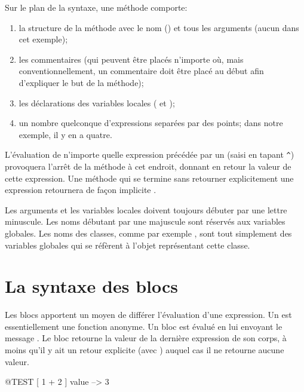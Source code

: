 \documentclass[a4paper,10pt,twoside]{book}
\begin{document}
Sur le plan de la syntaxe, une m\'{e}thode comporte:
\begin{enumerate}
  \item la structure de la m\'{e}thode avec le nom (\ie {}) et tous les arguments (aucun dans cet exemple);
  \item les commentaires (qui peuvent \^{e}tre plac\'{e}s n'importe
    o\`{u}, mais conventionnellement, un commentaire doit \^{e}tre plac\'{e} au d\'{e}but afin d'expliquer le but de la m\'{e}thode);
  \item les d\'{e}clarations des variables locales (\ie {} et
    ); 
  \item un nombre quelconque d'expressions separ\'{e}es par des points; dans notre exemple, il y en a quatre.
\end{enumerate}

L'\'{e}valuation de n'importe quelle expression pr\'{e}c\'{e}d\'{e}e
par un \ct{^} (saisi en tapant \verb|^|) provoquera l'arr\^{e}t de la m\'{e}thode \`{a} cet endroit, donnant en retour la valeur de cette expression.
Une m\'{e}thode qui se termine sans retourner explicitement une expression retournera de fa\c{c}on implicite .


Les arguments et les variables locales doivent toujours d\'{e}buter par une lettre minuscule.
Les noms d\'{e}butant par une majuscule sont r\'{e}servés aux variables globales.
Les noms des classes, comme par exemple , sont tout
simplement des variables globales qui se réfèrent à l'objet repr\'{e}sentant cette classe.

\section{La syntaxe des blocs}

Les blocs apportent un moyen de diff\'{e}rer l'\'{e}valuation d'une expression.
Un  est essentiellement une fonction anonyme. Un bloc est \'{e}valu\'{e} en lui envoyant le message .
Le bloc retourne la valeur de la derni\`{e}re expression de son corps,
\`{a} moins qu'il y ait un retour explicite (avec \ct{^}) auquel cas il ne retourne aucune valeur.

\begin{code}{@TEST}
[ 1 + 2 ] value --> 3
\end{code}
\end{document}
